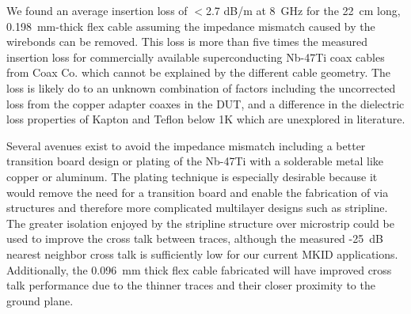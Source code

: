 We found an average insertion loss of $<$2.7 dB/m at 8~GHz for the 22~cm long, 0.198~mm-thick flex cable assuming the impedance mismatch caused by the wirebonds can be removed. This loss is more than five times the measured insertion loss for commercially available superconducting Nb-47Ti coax cables from Coax Co. which cannot be explained by the different cable geometry. The loss is likely do to an unknown combination of factors including the uncorrected loss from the copper adapter coaxes in the DUT, and a difference in the dielectric loss properties of Kapton and Teflon below 1K which are unexplored in literature.

Several avenues exist to avoid the impedance mismatch including a better transition board design or plating of the Nb-47Ti with a solderable metal like copper or aluminum. The plating technique is especially desirable because it would remove the need for a transition board and enable the fabrication of via structures and therefore more complicated multilayer designs such as stripline. The greater isolation enjoyed by the stripline structure over microstrip could be used to improve the cross talk between traces, although the measured -25~dB nearest neighbor cross talk is sufficiently low for our current MKID applications. Additionally, the 0.096~mm thick flex cable fabricated will have improved cross talk performance due to the thinner traces and their closer proximity to the ground plane. 